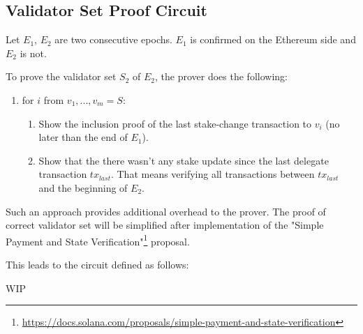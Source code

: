 \subsection{Validator Set Proof Circuit}

Let $E_1$, $E_2$ are two consecutive epochs. $E_1$ is confirmed on the Ethereum side and $E_2$ is not.

To prove the validator set $S_2$ of $E_2$, the prover does the following:
\begin{enumerate}
	\item for $i$ from ${v_1, ..., v_m} = S$:
	\begin{enumerate}
		\item Show the inclusion proof of the last stake-change transaction to $v_i$ (no later than the end of $E_1$).
		\item Show that the there wasn't any stake update since the last delegate transaction $tx_{last}$.
		That means verifying all transactions between $tx_{last}$ and the beginning of $E_2$.
	\end{enumerate}
\end{enumerate}

Such an approach provides additional overhead to the prover.
The proof of correct validator set will be simplified after implementation of the "Simple Payment and State Verification"\footnote{\url{https://docs.solana.com/proposals/simple-payment-and-state-verification}} proposal.

This leads to the circuit defined as follows:

WIP

